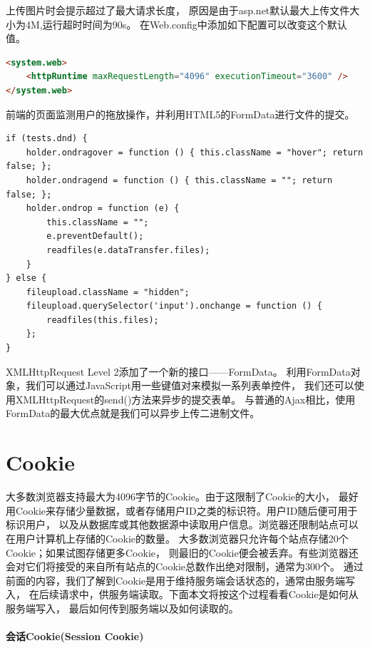 \documentclass{book}
\begin{document}
上传图片时会提示超过了最大请求长度，
原因是由于asp.net默认最大上传文件大小为4M,运行超时时间为90s。
在Web.config中添加如下配置可以改变这个默认值。

\begin{lstlisting}[language=HTML]
<system.web>
	<httpRuntime maxRequestLength="4096" executionTimeout="3600" />
</system.web>
\end{lstlisting}

前端的页面监测用户的拖放操作，并利用HTML5的FormData进行文件的提交。

\begin{lstlisting}[language=VBScript]
if (tests.dnd) {
    holder.ondragover = function () { this.className = "hover"; return false; };
    holder.ondragend = function () { this.className = ""; return false; };
    holder.ondrop = function (e) {
        this.className = "";
        e.preventDefault();
        readfiles(e.dataTransfer.files);
    }
} else {
    fileupload.className = "hidden";
    fileupload.querySelector('input').onchange = function () {
        readfiles(this.files);
    };
}
\end{lstlisting}

XMLHttpRequest Level 2添加了一个新的接口——FormData。
利用FormData对象，我们可以通过JavaScript用一些键值对来模拟一系列表单控件，
我们还可以使用XMLHttpRequest的send()方法来异步的提交表单。
与普通的Ajax相比，使用FormData的最大优点就是我们可以异步上传二进制文件。

\section{Cookie}

大多数浏览器支持最大为4096字节的Cookie。由于这限制了Cookie的大小，
最好用Cookie来存储少量数据，或者存储用户ID之类的标识符。用户ID随后便可用于标识用户，
以及从数据库或其他数据源中读取用户信息。浏览器还限制站点可以在用户计算机上存储的Cookie的数量。
大多数浏览器只允许每个站点存储20个Cookie；如果试图存储更多Cookie，
则最旧的Cookie便会被丢弃。有些浏览器还会对它们将接受的来自所有站点的Cookie总数作出绝对限制，通常为300个。
通过前面的内容，我们了解到Cookie是用于维持服务端会话状态的，通常由服务端写入，
在后续请求中，供服务端读取。下面本文将按这个过程看看Cookie是如何从服务端写入，
最后如何传到服务端以及如何读取的。 

\paragraph{会话Cookie(Session Cookie)}
\end{document}
